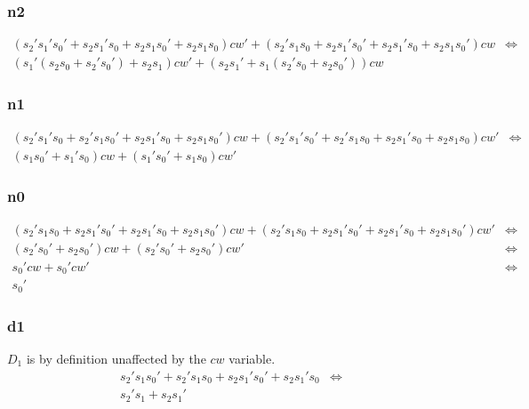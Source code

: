 
\subsubsection{n2}
\begin{eqnarray*}
\left(s_{2}'s_{1}'s_{0}'+s_{2}s_{1}'s_{0}+s_{2}s_{1}s_{0}'+s_{2}s_{1}s_{0}\right)cw'+\left(s_{2}'s_{1}s_{0}+s_{2}s_{1}'s_{0}'+s_{2}s_{1}'s_{0}+s_{2}s_{1}s_{0}'\right)cw & \Leftrightarrow\\
\left(s_{1}'\left(s_{2}s_{0}+s_{2}'s_{0}'\right)+s_{2}s_{1}\right)cw'+\left(s_{2}s_{1}'+s_{1}\left(s_{2}'s_{0}+s_{2}s_{0}'\right)\right)cw\end{eqnarray*}

\subsubsection{n1}
\begin{eqnarray*}
\left(s_{2}'s_{1}'s_{0}+s_{2}'s_{1}s_{0}'+s_{2}s_{1}'s_{0}+s_{2}s_{1}s_{0}'\right)cw+\left(s_{2}'s_{1}'s_{0}'+s_{2}'s_{1}s_{0}+s_{2}s_{1}'s_{0}+s_{2}s_{1}s_{0}\right)cw' & \Leftrightarrow\\
\left(s_{1}s_{0}'+s_{1}'s_{0}\right)cw+\left(s_{1}'s_{0}'+s_{1}s_{0}\right)cw'\end{eqnarray*}
\subsubsection{n0}

\begin{eqnarray*}
\left(s_{2}'s_{1}s_{0}+s_{2}s_{1}'s_{0}'+s_{2}s_{1}'s_{0}+s_{2}s_{1}s_{0}'\right)cw+\left(s_{2}'s_{1}s_{0}+s_{2}s_{1}'s_{0}'+s_{2}s_{1}'s_{0}+s_{2}s_{1}s_{0}'\right)cw' & \Leftrightarrow\\
\left(s_{2}'s_{0}'+s_{2}s_{0}'\right)cw+\left(s_{2}'s_{0}'+s_{2}s_{0}'\right)cw' & \Leftrightarrow\\
s_{0}'cw+s_{0}'cw' & \Leftrightarrow\\
s_{0}'\end{eqnarray*}

\subsubsection{d1}
$D_{1}$ is by definition unaffected by the $cw$ variable. 
\begin{eqnarray*}
s_{2}'s_{1}s_{0}' + s_{2}'s_{1}s_{0} + s_{2}s_{1}'s_{0}' + s_{2}s_{1}'s_{0} & \Leftrightarrow\\
s_{2}'s_{1} + s_{2}s_{1}'
\end{eqnarray*}


